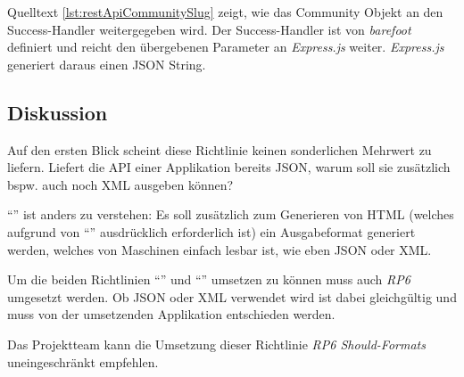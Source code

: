Quelltext \ref{lst:restApiCommunitySlug} zeigt, wie das Community Objekt an den Success-Handler weitergegeben wird. Der Success-Handler ist von \emph{barefoot} definiert und reicht den übergebenen Parameter an \emph{Express.js} weiter. \emph{Express.js} generiert daraus einen JSON String.

\subsection*{Diskussion}
Auf den ersten Blick scheint diese Richtlinie keinen sonderlichen Mehrwert zu liefern. Liefert die API einer Applikation bereits JSON, warum soll sie zusätzlich bspw. auch noch XML ausgeben können?

``'' ist anders zu verstehen: Es soll zusätzlich zum Generieren von HTML (welches aufgrund von ``'' ausdrücklich erforderlich ist) ein Ausgabeformat generiert werden, welches von Maschinen einfach lesbar ist, wie eben JSON oder XML.

Um die beiden Richtlinien ``'' und ``'' umsetzen zu können muss auch \emph{RP6} umgesetzt werden. Ob JSON oder XML verwendet wird ist dabei gleichgültig und muss von der umsetzenden Applikation entschieden werden.

Das Projektteam kann die Umsetzung dieser Richtlinie \emph{RP6 Should-Formats} uneingeschränkt empfehlen.